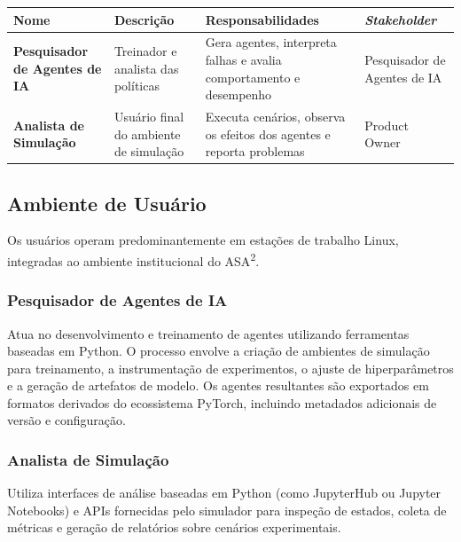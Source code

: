 \begin{table}[h]
    \begin{tabular}{| p{} | p{} | p{} | p{} | }
        \hline Nome & Descrição & Responsabilidades & \emph{Stakeholder} \\ \hline
              
        \textbf{Pesquisador de Agentes de IA} &
        Treinador e analista das políticas &
        Gera agentes, interpreta falhas e avalia comportamento e desempenho &
        Pesquisador de Agentes de IA \\ \hline
        
        \textbf{Analista de Simulação} &
        Usuário final do ambiente de simulação &
        Executa cenários, observa os efeitos dos agentes e reporta problemas &
        Product Owner \\ \hline

    \end{tabular}
\end{table}

\subsection{Ambiente de Usuário}

Os usuários operam predominantemente em estações de trabalho Linux, integradas ao ambiente institucional do ASA\textsuperscript{2}.

\subsubsection{Pesquisador de Agentes de IA}

Atua no desenvolvimento e treinamento de agentes utilizando ferramentas baseadas em Python. O processo envolve a criação de ambientes de simulação para treinamento, a instrumentação de experimentos, o ajuste de hiperparâmetros e a geração de artefatos de modelo. Os agentes resultantes são exportados em formatos derivados do ecossistema PyTorch, incluindo metadados adicionais de versão e configuração.

\subsubsection{Analista de Simulação}

Utiliza interfaces de análise baseadas em Python (como JupyterHub ou Jupyter Notebooks) e APIs fornecidas pelo simulador para inspeção de estados, coleta de métricas e geração de relatórios sobre cenários experimentais.

